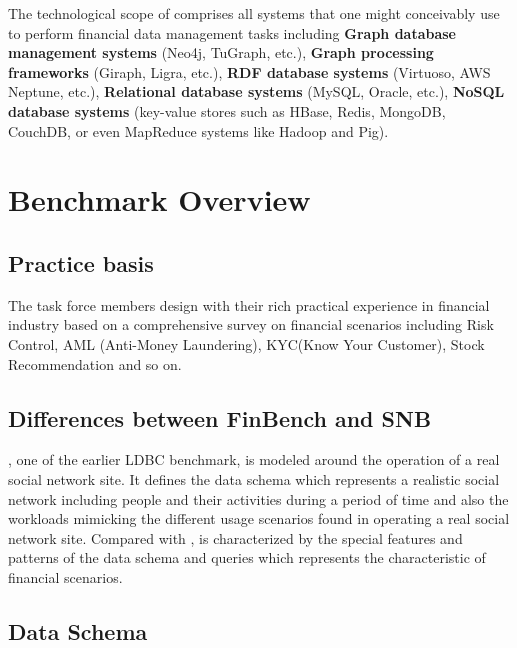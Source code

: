 The technological scope of \ldbcfinbench comprises all systems that one might
conceivably use to perform financial data management tasks including
\textbf{Graph database management systems} (\eg Neo4j, TuGraph, etc.), \textbf{
Graph processing frameworks} (\eg Giraph, Ligra, etc.), \textbf{RDF database
systems} (\eg Virtuoso, AWS Neptune, etc.), \textbf{Relational database systems}
(\eg MySQL, Oracle, etc.), \textbf{NoSQL database systems} (\eg key-value stores
such as HBase, Redis, MongoDB, CouchDB, or even MapReduce systems like Hadoop
and Pig).


\section{Benchmark Overview}

\subsection{Practice basis}

The task force members design \ldbcfinbench with their rich practical experience in
financial industry based on a comprehensive survey on financial scenarios including
Risk Control, AML (Anti-Money Laundering), KYC(Know Your Customer), Stock Recommendation
and so on.

\subsection{Differences between FinBench and SNB}

\ldbcsnb, one of the earlier LDBC benchmark, is modeled around the operation of a real social network site. It defines the data schema which represents a realistic social network including people and their activities during a period of time and also the workloads mimicking the different usage scenarios found in operating a real social network site. Compared with \ldbcsnb, \ldbcfinbench is characterized by the special features and patterns of the data schema and queries which represents the characteristic of financial scenarios.

\subsection{Data Schema}


